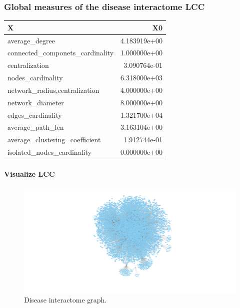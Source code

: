 \documentclass[
]{article}
\begin{document}
\hypertarget{global-measures-of-the-disease-interactome-lcc}{%
\subsubsection{Global measures of the disease interactome
LCC}\label{global-measures-of-the-disease-interactome-lcc}}

\begin{table}[H]
\centering
\begin{tabular}[t]{l|r}
\hline
X & X0\\
\hline
average\_degree & 4.183919e+00\\
\hline
connected\_componets\_cardinality & 1.000000e+00\\
\hline
centralization & 3.090764e-01\\
\hline
nodes\_cardinality & 6.318000e+03\\
\hline
network\_radius,centralization & 4.000000e+00\\
\hline
network\_diameter & 8.000000e+00\\
\hline
edges\_cardinality & 1.321700e+04\\
\hline
average\_path\_len & 3.163104e+00\\
\hline
average\_clustering\_coefficient & 1.912744e-01\\
\hline
isolated\_nodes\_cardinality & 0.000000e+00\\
\hline
\end{tabular}
\end{table}

\hypertarget{visualize-lcc}{%
\paragraph{Visualize LCC}\label{visualize-lcc}}

\begin{figure}
\centering
\includegraphics{g.graphml.png}
\caption{Disease interactome graph.}
\end{figure}
\end{document}
